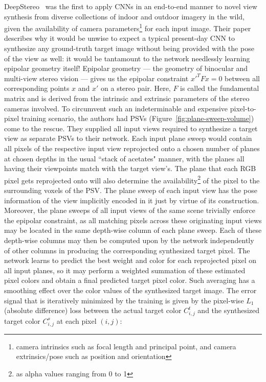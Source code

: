 DeepStereo~\cite{deep_stereo_2016} was the first to apply CNNs in an end-to-end manner to novel view synthesis from diverse collections of indoor and outdoor imagery in the wild, given the availability of camera parameters\footnote{camera intrinsics such as focal length and principal point, and camera extrinsics/pose such as position and orientation} for each input image. Their paper describes why it would be unwise to expect a typical present-day CNN to synthesize any ground-truth target image without being provided with the pose of the view as well: it would be tantamount to the network needlessly learning epipolar geometry itself! Epipolar geometry --- the geometry of binocular and multi-view stereo vision --- gives us the epipolar constraint $x'^T F x = 0$ between all corresponding points $x$ and $x'$ on a stereo pair. Here, $F$ is called the fundamental matrix and is derived from the intrinsic and extrinsic parameters of the stereo cameras involved. To circumvent such an indeterminable and expensive pixel-to-pixel training scenario, the authors had PSVs (Figure~\ref{fig:plane-sweep-volume}) come to the rescue. They supplied all input views required to synthesize a target view as separate PSVs to their network. Each input plane sweep would contain all pixels of the respective input view reprojected onto a chosen number of planes at chosen depths in the usual ``stack of acetates" manner, with the planes all having their viewpoints match with the target view's. The plane that each RGB pixel gets reprojected onto will also determine the availability\footnote{as alpha values ranging from 0 to 1} of the pixel to the surrounding voxels of the PSV. The plane sweep of each input view has the pose information of the view implicitly encoded in it just by virtue of its construction. Moreover, the plane sweeps of all input views of the same scene trivially enforce the epipolar constraint, as all matching pixels across these originating input views may be located in the same depth-wise column of each plane sweep. Each of these depth-wise columns may then be computed upon by the network independently of other columns in producing the corresponding synthesized target pixel. The network learns to predict the best weight and color for each reprojected pixel on all input planes, so it may perform a weighted summation of these estimated pixel colors and obtain a final predicted target pixel color. Such averaging has a smoothing effect over the color values of the synthesized target image. The error signal that is iteratively minimized by the training is given by the pixel-wise $L_1$ (absolute difference) loss between the actual target color $C_{i,j}^t$ and the synthesized target color $C_{i,j}^s$ at each pixel $(i,j)$:

